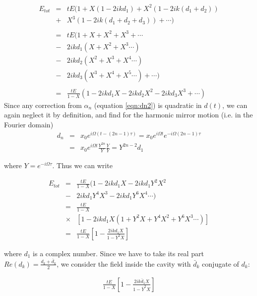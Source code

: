 \begin{eqnarray}
E_{tot}&=&tE(1+X(1-2ikd_1) +X^2(1-2ik(d_1+d_2))\nonumber\\
&+&X^3(1-2ik(d_1+d_2+d_3)) + \cdots )\nonumber \\
\nonumber \\
&=&tE(1+X+X^2+X^3 +\cdots\nonumber\\
&-& 2ikd_1(X+X^2+X^3\cdots)\nonumber\\
&-&2ikd_2(X^2+X^3+X^4\cdots)\nonumber\\  
&-&2ikd_3(X^3+X^4+X^5\cdots)+\cdots) \nonumber \\
\nonumber \\
&=&\frac{tE}{1-X}(1-2ikd_1 X-2ikd_2 X^2-2ikd_3 X^3+\cdots) \nonumber
\end{eqnarray}
Since any correction from $\alpha_n$ (equation \ref{eqn:dn2}) is quadratic in $d(t)$, we can again neglect it by definition, and find for the harmonic mirror motion (i.e. in the Fourier domain)
\begin{eqnarray}
d_n&=&x_0e^{i\Omega(t-(2n-1)\tau)}=x_0e^{i\Omega t}e^{-i\Omega(2n-1)\tau}\nonumber\\
&=&x_0e^{i\Omega t} \frac{Y^{2n}}{Y}\frac{Y}{Y}=Y^{2n-2}d_1
\end{eqnarray}

where $Y=e^{-i\Omega\tau}$. Thus we can write


\begin{eqnarray}
E_{tot}&=&\frac{tE}{1-X}(1-2ikd_1 X-2ikd_1 Y^2X^2\nonumber\\
&-&2ikd_1 Y^4 X^3-2ikd_1 Y^6 X^4\cdots)\\
&=&\frac{tE}{1-X}\nonumber\\
&\times &\left[1-2ikd_1 X(1+ Y^2X+ Y^4 X^2+Y^6 X^3\cdots)\right]\nonumber\\
&=&\frac{tE}{1-X}\left [1-\frac{2ikd_1 X}{1-Y^2X}\right ]
\end{eqnarray}

where $d_1$ is a complex number. Since we have to take its real part $Re (d_k)=\frac{d_k+\bar{d}_k}{2}$,
we consider the field inside the cavity with $\bar{d}_k$ conjugate of $d_k$:

\begin{eqnarray}
\frac{tE}{1-X}\left [1-\frac{2ik\bar{d}_1 X}{1-\overline{Y}^2 X}\right ]
\end{eqnarray}

